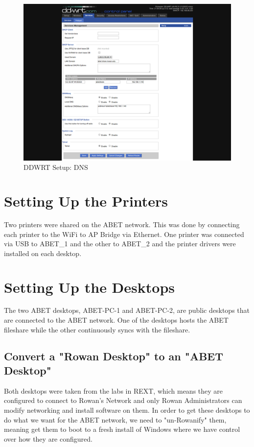 \documentclass{article}
\begin{document}
\begin{figure}[H]
  \begin{center}
    \includegraphics[scale=0.30]{./img/ddwrt/03_dns.png}
  \end{center}
  \caption{DDWRT Setup: DNS}
  \label{fig:03_dns}
\end{figure}

\section{Setting Up the Printers}
Two printers were shared on the ABET network. This was done by
connecting each printer to the WiFi to AP Bridge via Ethernet. One printer was
connected via USB to ABET\_1 and the other to ABET\_2 and the printer drivers were
installed on each desktop.

\section{Setting Up the Desktops}
The two ABET desktops, ABET-PC-1 and ABET-PC-2, are public desktops that are connected to the ABET network. One of the desktops hosts the ABET fileshare while the other
continuously syncs with the fileshare.

\subsection{Convert a "Rowan Desktop" to an "ABET Desktop"}
Both desktops were taken from the labs in REXT, which means they are configured to connect to Rowan's Network and only Rowan Administrators can modify networking and install
software on them. In order to get these desktops to do what we want for the ABET network, we need to "un-Rowanify" them, meaning get them to boot to a fresh install of
Windows where we have control over how they are configured.
\end{document}
